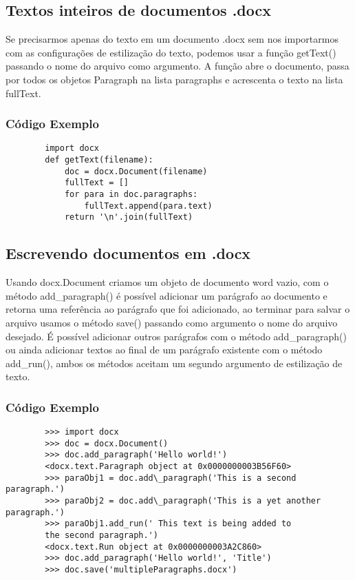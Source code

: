 \documentclass[12pt,a4paper,article]{report}
\begin{document}
\subsection{Textos inteiros de documentos .docx}
    Se precisarmos apenas do texto em um documento .docx sem nos importarmos com as configurações de estilização do texto, podemos usar a função getText() passando o nome do arquivo como argumento. A função abre o documento, passa por todos os objetos Paragraph na lista paragraphs e acrescenta o texto na lista fullText.
    
\subsubsection{Código Exemplo}
    \begin{verbatim}
        import docx
        def getText(filename):
            doc = docx.Document(filename)
            fullText = []
            for para in doc.paragraphs:
                fullText.append(para.text)
            return '\n'.join(fullText)
    \end{verbatim}
    
\subsection{Escrevendo documentos em .docx}
    Usando docx.Document criamos um objeto de documento word vazio, com o método add\_paragraph() é possível adicionar um parágrafo ao documento e retorna uma referência ao parágrafo que foi adicionado, ao terminar para salvar o arquivo usamos o método save() passando como argumento o nome do arquivo desejado. É possível adicionar outros parágrafos com o método add\_paragraph() ou ainda adicionar textos ao final de um parágrafo existente com o método add\_run(), ambos os métodos aceitam um segundo argumento de estilização de texto.

\subsubsection{Código Exemplo}
    \begin{verbatim}
        >>> import docx
        >>> doc = docx.Document() 
        >>> doc.add_paragraph('Hello world!')
        <docx.text.Paragraph object at 0x0000000003B56F60>
        >>> paraObj1 = doc.add\_paragraph('This is a second paragraph.') 
        >>> paraObj2 = doc.add\_paragraph('This is a yet another paragraph.')
        >>> paraObj1.add_run(' This text is being added to 
        the second paragraph.') 
        <docx.text.Run object at 0x0000000003A2C860>
        >>> doc.add_paragraph('Hello world!', 'Title')
        >>> doc.save('multipleParagraphs.docx')
    \end{verbatim}
\end{document}
